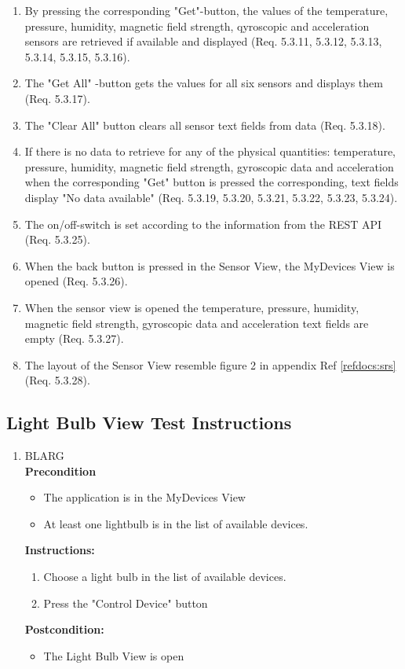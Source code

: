 \documentclass[a4paper]{article}
\newlength{\testlabellength}
\newenvironment{testlist}{\begin{enumerate}[label=\bfseries Instruction \thesubsection.\arabic* , labelindent=0pt, labelwidth=\testlabellength , leftmargin=2cm]}{\end{enumerate}}
\newenvironment{precondition}{
{\color{white}BLARG}\\ 
\textbf{Precondition}
\begin{itemize}[labelindent=0cm, labelwidth=2cm , leftmargin=1cm]
}
{\end{itemize}}
\newenvironment{instruction}{
\textbf{Instructions:}
\begin{enumerate}[label=\bfseries  \arabic*., labelindent=0cm, labelwidth=2cm , leftmargin=1cm]
}
{\end{enumerate}}
\newenvironment{postcondition}{
\textbf{Postcondition:}
\begin{itemize}[labelindent=0cm, labelwidth=2cm , leftmargin=1cm]
}
{\end{itemize}}
\begin{document}
\begin{appendices}
\begin{testlist}
\item By pressing the corresponding "Get"-button, the values of the temperature, pressure, humidity, magnetic field strength, qyroscopic and acceleration sensors are retrieved if available and displayed (Req. 5.3.11, 5.3.12, 5.3.13, 5.3.14, 5.3.15, 5.3.16).

\item The "Get All" -button gets the values for all six sensors and displays them (Req. 5.3.17).

\item The "Clear All" button clears all sensor text fields from data (Req. 5.3.18).

\item If there is no data to retrieve for any of the physical quantities: temperature, pressure, humidity, magnetic field strength, gyroscopic data and acceleration when the corresponding "Get" button is pressed the corresponding, text fields display "No data available" (Req. 5.3.19, 5.3.20, 5.3.21, 5.3.22, 5.3.23, 5.3.24).

\item The on/off-switch is set according to the information from the REST API (Req. 5.3.25).

\item When the back button is pressed in the Sensor View, the MyDevices View is opened (Req. 5.3.26).

\item When the sensor view is opened the temperature, pressure, humidity, magnetic field strength, gyroscopic data and acceleration text fields are empty (Req. 5.3.27).

\item The layout of the Sensor View resemble figure 2 in appendix  Ref \ref{refdocs:srs} (Req. 5.3.28).

\end{testlist}

\subsection{Light Bulb View Test Instructions}
\begin{testlist}

    \item 	\begin{precondition}
    			\item The application is in the MyDevices View
    			\item At least one lightbulb is in the list of available devices.
    		\end{precondition}
    		\begin{instruction}
    				\item Choose a light bulb in the list of available devices.
    				\item Press the "Control Device" button
    		\end{instruction}
    		\begin{postcondition}
    			\item The Light Bulb View is open
    		\end{postcondition}


\end{testlist}
\end{appendices}
\end{document}
